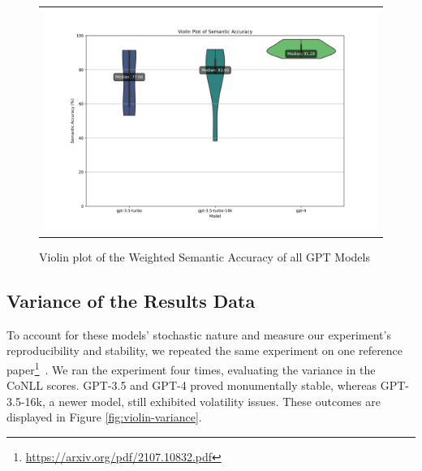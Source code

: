 \begin{figure}[htpb]
  \centering
  \begin{tabular}{c}
  \includegraphics[width=14cm]{images/semantic-accuracy.png}
  \end{tabular}
  \caption[Semantic Accuracy]{Violin plot of the Weighted Semantic Accuracy of all GPT Models}\label{fig:violin-semantic}
\end{figure}

\subsection{Variance of the Results Data}

To account for these models' stochastic nature and measure our experiment's reproducibility and stability, we repeated the same experiment on one reference paper\footnote{\url{https://arxiv.org/pdf/2107.10832.pdf}}~\citep{singleton2021logic}. We ran the experiment four times, evaluating the variance in the CoNLL scores. GPT-3.5 and GPT-4 proved monumentally stable, whereas GPT-3.5-16k, a newer model, still exhibited volatility issues. These outcomes are displayed in Figure \ref{fig:violin-variance}.

